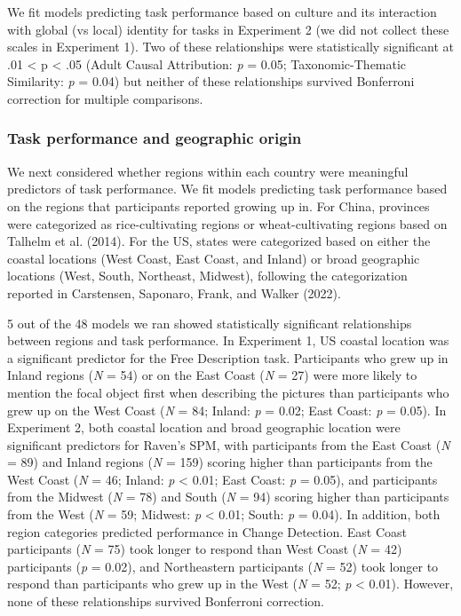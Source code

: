 \documentclass[
  man,floatsintext]{apa6}
\begin{document}
We fit models predicting task performance based on culture and its interaction with global (vs local) identity for tasks in Experiment 2 (we did not collect these scales in Experiment 1). Two of these relationships were statistically significant at .01 \textless{} p \textless{} .05 (Adult Causal Attribution: \emph{p} = 0.05; Taxonomic-Thematic Similarity: \emph{p} = 0.04) but neither of these relationships survived Bonferroni correction for multiple comparisons.

\hypertarget{task-performance-and-geographic-origin}{%
\subsubsection{Task performance and geographic origin}\label{task-performance-and-geographic-origin}}

We next considered whether regions within each country were meaningful predictors of task performance. We fit models predicting task performance based on the regions that participants reported growing up in. For China, provinces were categorized as rice-cultivating regions or wheat-cultivating regions based on Talhelm et al. (2014). For the US, states were categorized based on either the coastal locations (West Coast, East Coast, and Inland) or broad geographic locations (West, South, Northeast, Midwest), following the categorization reported in Carstensen, Saponaro, Frank, and Walker (2022).

5 out of the 48 models we ran showed statistically significant relationships between regions and task performance. In Experiment 1, US coastal location was a significant predictor for the Free Description task. Participants who grew up in Inland regions (\emph{N} = 54) or on the East Coast (\emph{N} = 27) were more likely to mention the focal object first when describing the pictures than participants who grew up on the West Coast (\emph{N} = 84; Inland: \emph{p} = 0.02; East Coast: \emph{p} = 0.05). In Experiment 2, both coastal location and broad geographic location were significant predictors for Raven's SPM, with participants from the East Coast (\emph{N} = 89) and Inland regions (\emph{N} = 159) scoring higher than participants from the West Coast (\emph{N} = 46; Inland: \emph{p} \textless{} 0.01; East Coast: \emph{p} = 0.05), and participants from the Midwest (\emph{N} = 78) and South (\emph{N} = 94) scoring higher than participants from the West (\emph{N} = 59; Midwest: \emph{p} \textless{} 0.01; South: \emph{p} = 0.04). In addition, both region categories predicted performance in Change Detection. East Coast participants (\emph{N} = 75) took longer to respond than West Coast (\emph{N} = 42) participants (\emph{p} = 0.02), and Northeastern participants (\emph{N} = 52) took longer to respond than participants who grew up in the West (\emph{N} = 52; \emph{p} \textless{} 0.01). However, none of these relationships survived Bonferroni correction.
\end{document}
